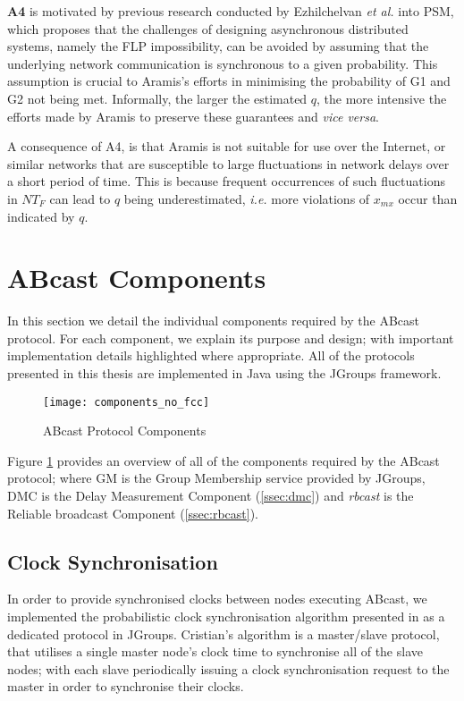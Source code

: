 \begin{description}
        \textbf{A4} is motivated by previous research conducted by Ezhilchelvan \emph{et al.} \citep{Ezhilchelvan:2010:LPR:1773912.1773927} into PSM, which proposes that the challenges of designing asynchronous distributed systems, namely the FLP impossibility, can be avoided by assuming that the underlying network communication is synchronous to a given probability.  This assumption is crucial to \textsf{Aramis}'s efforts in minimising the probability of G1 and G2 not being met.  Informally, the larger the estimated $q$, the more intensive the efforts made by \textsf{Aramis} to preserve these guarantees and \emph{vice versa}.   
        
        A consequence of A4, is that \textsf{Aramis} is not suitable for use over the Internet, or similar networks that are susceptible to large fluctuations in network delays over a short period of time.  This is because frequent occurrences of such fluctuations in $NT_F$ can lead to $q$ being underestimated, \emph{i.e.} more violations of $x_{mx}$ occur than indicated by $q$.          
    \end{description}
    
\section{ABcast Components}
In this section we detail the individual components required by the \textsf{ABcast} protocol.  For each component, we explain its purpose and design; with important implementation details highlighted where appropriate.  All of the protocols presented in this thesis are implemented in Java using the JGroups framework.  

    \begin{figure}[!h] 
        \centering    
         \texttt{[image: components\_no\_fcc]}
         \caption[\textsf{ABcast} Protocol Components Overview]{\textsf{ABcast} Protocol Components}
         \label{fig:abcast_components}
    \end{figure}
    
   Figure \ref{fig:abcast_components} provides an overview of all of the components required by the \textsf{ABcast} protocol; where GM is the Group Membership service provided by JGroups, DMC is the Delay Measurement Component (\ref{ssec:dmc}) and \emph{rbcast} is the Reliable broadcast Component (\ref{ssec:rbcast}).  

    \subsection{Clock Synchronisation}\label{ssec:clocksynch}
    In order to provide synchronised clocks between nodes executing \textsf{ABcast}, we implemented the probabilistic clock synchronisation algorithm presented in \citep{Cristian:1996:SA:227210.227231} as a dedicated protocol in JGroups.  Cristian's algorithm is a master/slave protocol, that utilises a single master node's clock time to synchronise all of the slave nodes; with each slave periodically issuing a clock synchronisation request to the master in order to synchronise their clocks.  
            
